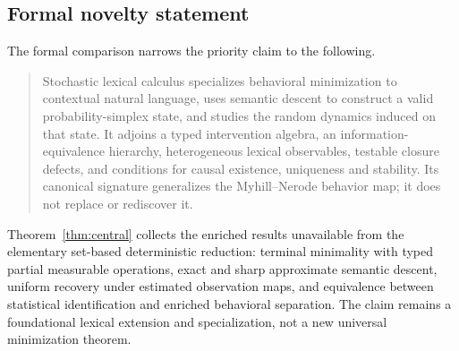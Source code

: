 \documentclass[11pt]{article}
\begin{document}
{\subsection{Formal novelty statement}

The formal comparison narrows the priority claim to the following.
\begin{quote}
Stochastic lexical calculus specializes behavioral minimization to contextual
natural language, uses semantic descent to construct a valid
probability-simplex state, and studies the random dynamics induced on that
state.  It adjoins a typed intervention algebra, an information-equivalence
hierarchy, heterogeneous lexical observables, testable closure defects, and
conditions for causal existence, uniqueness and stability.  Its canonical
signature generalizes the Myhill--Nerode behavior map; it does not replace or
rediscover it.
\end{quote}

Theorem~\ref{thm:central} collects the enriched results unavailable from the elementary set-based deterministic reduction: terminal minimality with typed partial measurable operations, exact and sharp approximate semantic descent, uniform recovery under estimated observation maps, and equivalence between statistical identification and enriched behavioral separation. The claim remains a foundational lexical extension and specialization, not a new universal minimization theorem.

}
\end{document}
